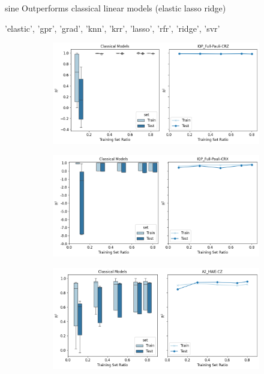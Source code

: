 \documentclass[journal=jacsat,manuscript=article]{achemso}
\begin{document}
sine
Outperforms classical linear models (elastic lasso ridge)



'elastic', 'gpr', 'grad', 'knn', 'krr', 'lasso', 'rfr', 'ridge', 'svr'


\begin{figure}[H]
	\centering	
	\begin{subfigure}[b]{0.49\textwidth}
		\centering
		\includegraphics[width=\linewidth]{../images/Function_Fitting/linear_learning_curves.png}
		\caption{}
		\label{fig:linear_learning_curves}
	\end{subfigure}
	\hfill	
	\begin{subfigure}[b]{0.49\textwidth}
		\centering
		\includegraphics[width=\linewidth]{../images/Function_Fitting/quadratic_learning_curves.png}
		\caption{}
		\label{fig:quadratic_learning_curves}
	\end{subfigure}
	\hfill
	\begin{subfigure}[b]{0.49\textwidth}
		\centering
		\includegraphics[width=\linewidth]{../images/Function_Fitting/sine_learning_curves.png}

\end{subfigure}
\end{figure}
\end{document}
